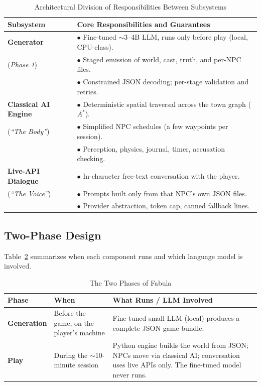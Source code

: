 \documentclass[11pt,a4paper]{article}
\providecommand{\toprule}{\hline\hline}
\providecommand{\midrule}{\hline}
\providecommand{\bottomrule}{\hline\hline}
\providecommand{\addlinespace}{\vspace{0.3em}}
\begin{document}
\begin{table}[htbp]
\centering
\small
\caption{Architectural Division of Responsibilities Between Subsystems}
\label{tab:hybrid_roles}
\begin{tabularx}{\textwidth}{lX}
\toprule
\textbf{Subsystem} & \textbf{Core Responsibilities and Guarantees} \\
\midrule
\textbf{Generator} & $\bullet$ Fine-tuned $\sim$3--4B LLM, runs only before play (local, CPU-class). \\
(\textit{Phase 1})  & $\bullet$ Staged emission of world, cast, truth, and per-NPC files. \\
                   & $\bullet$ Constrained JSON decoding; per-stage validation and retries. \\
\addlinespace
\textbf{Classical AI Engine} & $\bullet$ Deterministic spatial traversal across the town graph ($A^*$). \\
(\textit{``The Body''})       & $\bullet$ Simplified NPC schedules (a few waypoints per session). \\
                             & $\bullet$ Perception, physics, journal, timer, accusation checking. \\
\addlinespace
\textbf{Live-API Dialogue} & $\bullet$ In-character free-text conversation with the player. \\
(\textit{``The Voice''})    & $\bullet$ Prompts built only from that NPC's own JSON files. \\
                           & $\bullet$ Provider abstraction, token cap, canned fallback lines. \\
\bottomrule
\end{tabularx}
\end{table}

\subsection{Two-Phase Design}
Table~\ref{tab:twophase} summarizes when each component runs and which language model is involved.

\begin{table}[htbp]
\centering
\small
\caption{The Two Phases of Fabula}
\label{tab:twophase}
\begin{tabularx}{\textwidth}{llX}
\toprule
\textbf{Phase} & \textbf{When} & \textbf{What Runs / LLM Involved} \\
\midrule
\textbf{Generation} & Before the game, on the player's machine & Fine-tuned small LLM (local) produces a complete JSON game bundle. \\
\addlinespace
\textbf{Play} & During the $\sim$10-minute session & Python engine builds the world from JSON; NPCs move via classical AI; conversation uses live APIs only. The fine-tuned model never runs. \\
\bottomrule
\end{tabularx}
\end{table}
\end{document}
